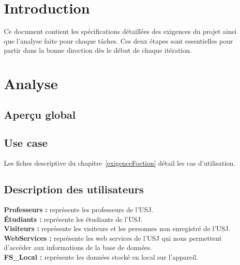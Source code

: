 \section{Introduction}
Ce document contient les spécifications détaillées des exigences du projet ainsi que l'analyse faite pour chaque tâches. Ces deux étapes sont essentielles pour partir dans la bonne direction dès le début de chaque itération. 
\section{Analyse}
	\subsection{ Aperçu global}
	\subsection{Use case}
	 Les fiches descriptive du chapitre~\ref{exigenceFoction} détail les cas d'utilisation.
	\subsection{Description des utilisateurs}
		\textbf{Professeurs :} représente les professeurs de l'USJ.\\[0.2cm]
		\textbf{Étudiants :} représente les étudiants de l'USJ.\\[0.2cm]
		\textbf{Visiteurs :} représente les visiteurs et les personnes non enregistré de l'USJ.\\[0.2cm]
		\textbf{WebServices :} représente les web services de l'\gls{USJ} qui nous permettent d'accéder aux informations de la base de données.\\[0.2cm]
		\textbf{FS\_Local :} représente les données stocké en local sur l'appareil.\\[0.2cm]
